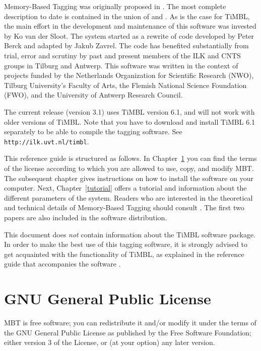 \documentclass{report}
\begin{document}
Memory-Based Tagging was originally proposed in
\cite{Daelemans95}. The most complete description to date is contained
in the union of \cite{Daelemans+96} and \cite{Zavrel+99}.  As is the
case for TiMBL, the main effort in the development and
maintenance of this software was invested by Ko van der Sloot. The
system started as a rewrite of code developed by Peter Berck and
adapted by Jakub Zavrel. The code has benefited substantially from
trial, error and scrutiny by past and present members of the ILK
and CNTS groups in Tilburg and Antwerp. This software was
written in the context of projects funded by the Netherlands
Organization for Scientific Research (NWO), Tilburg University's Faculty
of Arts, the Flemish National Science Foundation (FWO), and the
University of Antwerp Research Council.

The current release (version 3.1) uses TiMBL version 6.1, and will not
work with older versions of TiMBL. Note that you have to download
and install TiMBL 6.1 separately to be able to compile the tagging
software. See {\tt http://ilk.uvt.nl/timbl}.

This reference guide is structured as follows. In
Chapter~\ref{license} you can find the terms of the license according
to which you are allowed to use, copy, and modify MBT. The subsequent
chapter gives instructions on how to install the software on your
computer.  Next, Chapter~\ref{tutorial} offers a tutorial and
information about the different parameters of the system.  Readers who
are interested in the theoretical and technical details of
Memory-Based Tagging should consult
\cite{Daelemans+96,Zavrel+99,Daelemans+05}. The first two papers are
also included in the software distribution.

This document does {\em not}\/ contain information about the TiMBL
software package. In order to make the best use of this tagging
software, it is strongly advised to get acquainted with the
functionality of TiMBL, as explained in the reference guide that
accompanies the software \cite{Daelemans+07}.

\chapter{GNU General Public License}
\label{license}

MBT is free software; you can redistribute it and/or modify it under
the terms of the GNU General Public License as published by the Free
Software Foundation; either version 3 of the License, or (at your
option) any later version.
\end{document}
